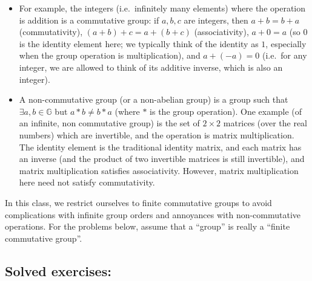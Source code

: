 \begin{itemize}
\item
  For example, the integers (i.e.~infinitely many elements) where the
  operation is addition is a commutative group: if \(a,b,c\) are
  integers, then \(a+b = b+a\) (commutativity), \((a+b)+c = a+(b+c)\)
  (associativity), \(a+0 = a\) (so \(0\) is the identity element here;
  we typically think of the identity as \(1\), especially when the group
  operation is multiplication), and \(a+(-a) = 0\) (i.e.~for any
  integer, we are allowed to think of its additive inverse, which is
  also an integer).
\item
  A non-commutative group (or a non-abelian group) is a group such that
  \(\exists a,b \in \mathbb{G}\) but \(a * b \neq b * a\) (where \(*\)
  is the group operation). One example (of an infinite, non commutative
  group) is the set of \(2 \times 2\) matrices (over the real numbers)
  which are invertible, and the operation is matrix multiplication. The
  identity element is the traditional identity matrix, and each matrix
  has an inverse (and the product of two invertible matrices is still
  invertible), and matrix multiplication satisfies associativity.
  However, matrix multiplication here need not satisfy commutativity.
\end{itemize}

In this class, we restrict ourselves to finite commutative groups to
avoid complications with infinite group orders and annoyances with
non-commutative operations. For the problems below, assume that a
``group'' is really a ``finite commutative group''.

\subsection{Solved exercises:}\label{Solved-exercises}

\hypertarget{grouptheoryex1}{}

